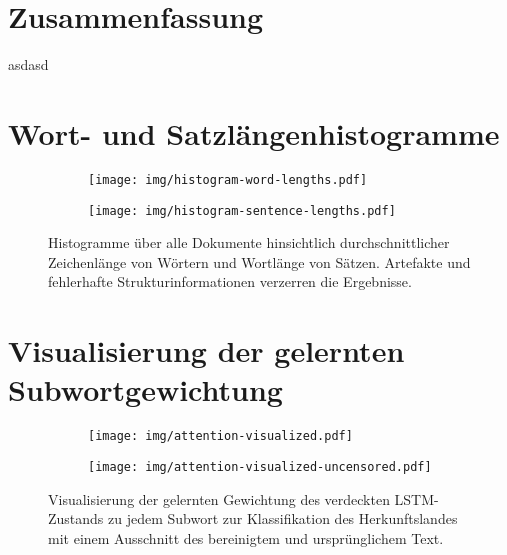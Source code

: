 \documentclass[bachelor,german]{info1thesis}
\begin{document}
\chapter{Zusammenfassung}
asdasd



\thesisbibliography


\appendix

\chapter{Wort- und Satzlängenhistogramme}
\label{app:word-sentence-lengths}

\begin{figure}[h!]
     \centering
     \begin{subfigure}[b]{0.49\textwidth}
         \centering
         \texttt{[image: img/histogram-word-lengths.pdf]}
         \label{fig:hist-mentions}
     \end{subfigure}
     \hfill
     \begin{subfigure}[b]{0.49\textwidth}
         \centering
         \texttt{[image: img/histogram-sentence-lengths.pdf]}
         \label{fig:hist-clusters}
     \end{subfigure}
     \caption{Histogramme über alle Dokumente hinsichtlich durchschnittlicher Zeichenlänge von Wörtern und Wortlänge von Sätzen. Artefakte und fehlerhafte Strukturinformationen verzerren die Ergebnisse.}
     \label{fig:droc-histograms}
\end{figure}

\chapter{Visualisierung der gelernten Subwortgewichtung}

\begin{figure}[h!]
     \centering
     \begin{subfigure}[b]{\textwidth}
         \centering
         \texttt{[image: img/attention-visualized.pdf]}
         \label{fig:visualized-cleaned-text}
     \end{subfigure}
     \begin{subfigure}[b]{\textwidth}
         \centering
         \vspace{.5em}
         \texttt{[image: img/attention-visualized-uncensored.pdf]}
         \label{fig:visualized-original-text}
     \end{subfigure}
     \caption{Visualisierung der gelernten Gewichtung des verdeckten LSTM-Zustands zu jedem Subwort zur Klassifikation des Herkunftslandes mit einem Ausschnitt des bereinigtem und ursprünglichem Text.}
     \label{fig:visualized-texts}
\end{figure}
\end{document}
